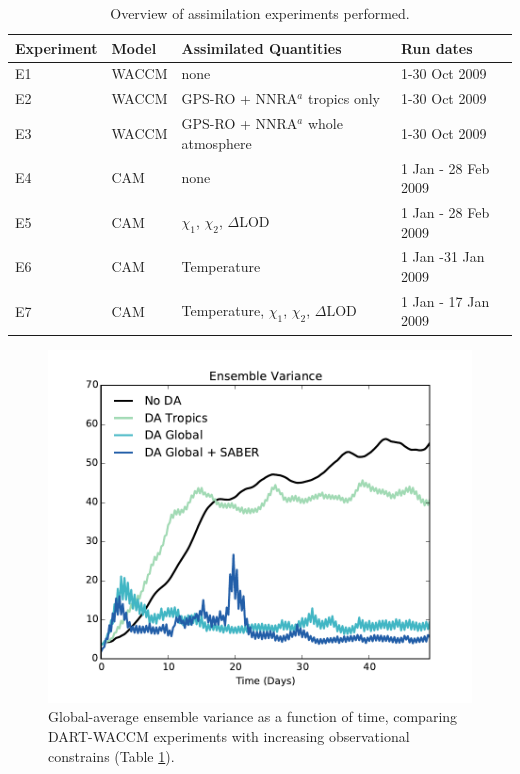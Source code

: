 \begin{table}
\caption{Overview of assimilation experiments performed.}
\centering
\begin{tabular}{p{2cm}p{2cm}p{6cm}p{4cm}}
	Experiment& Model &  Assimilated Quantities  & Run dates \\
\hline
E1 & WACCM &	none   & 1-30 Oct 2009	\\
E2 & WACCM &	GPS-RO + NNRA$^a$ tropics only & 1-30 Oct 2009	\\
E3 & WACCM &	GPS-RO + NNRA$^a$ whole atmosphere  & 1-30 Oct 2009	\\
E4 & CAM	&	none &  1 Jan - 28 Feb 2009 \\
E5 & CAM &	$\chi_1$, $\chi_2$, $\Delta$LOD	& 1 Jan - 28 Feb 2009 \\
E6 & CAM &	Temperature	& 1 Jan -31 Jan 2009	\\
E7 & CAM &	Temperature, $\chi_1$, $\chi_2$, $\Delta$LOD	& 1 Jan - 17 Jan 2009\\
\hline
\end{tabular}
\label{tab:expts}
\end{table}
\clearpage

 \begin{figure}
	 \includegraphics[width=\textwidth]{Paper_figures/ERPDA_paper_evalvariable_state_space.pdf}
	 \caption{Global-average ensemble variance as a function of time, comparing DART-WACCM experiments with increasing observational constrains (Table \ref{tab:expts}).}
	 \label{fig:evalvariable_state}
\end{figure}

